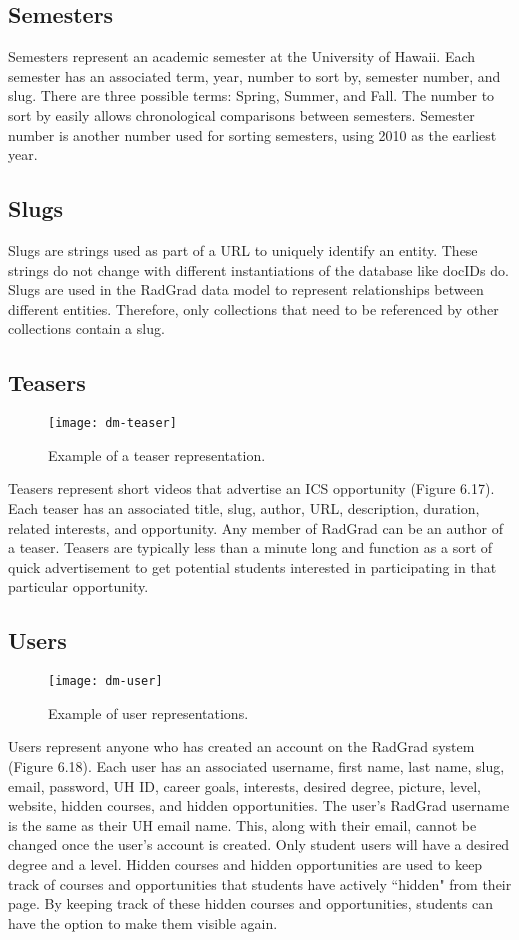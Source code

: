\subsection{Semesters}
Semesters represent an academic semester at the University of Hawaii. Each semester has an associated term, year, number to sort by, semester number, and slug. There are three possible terms: Spring, Summer, and Fall. The number to sort by easily allows chronological comparisons between semesters. Semester number is another number used for sorting semesters, using 2010 as the earliest year. 

\subsection{Slugs}
Slugs are strings used as part of a URL to uniquely identify an entity. These strings do not change with different instantiations of the database like docIDs do. Slugs are used in the RadGrad data model to represent relationships between different entities. Therefore, only collections that need to be referenced by other collections contain a slug. 

\subsection{Teasers}
\begin{figure}[h]
\centering
\texttt{[image: dm-teaser]}
\caption{Example of a teaser representation.}
\end{figure}
Teasers represent short videos that advertise an ICS opportunity (Figure 6.17). Each teaser has an associated title, slug, author, URL, description, duration, related interests, and opportunity. Any member of RadGrad can be an author of a teaser. Teasers are typically less than a minute long and function as a sort of quick advertisement to get potential students interested in participating in that particular opportunity. 

\subsection{Users}
\begin{figure}[h]
\centering
\texttt{[image: dm-user]}
\caption{Example of user representations.}
\end{figure}
Users represent anyone who has created an account on the RadGrad system (Figure 6.18). Each user has an associated username, first name, last name, slug, email, password, UH ID, career goals, interests, desired degree, picture, level, website, hidden courses, and hidden opportunities. The user's RadGrad username is the same as their UH email name. This, along with their email, cannot be changed once the user's account is created. Only student users will have a desired degree and a level. Hidden courses and hidden opportunities are used to keep track of courses and opportunities that students have actively ``hidden" from their page. By keeping track of these hidden courses and opportunities, students can have the option to make them visible again.

